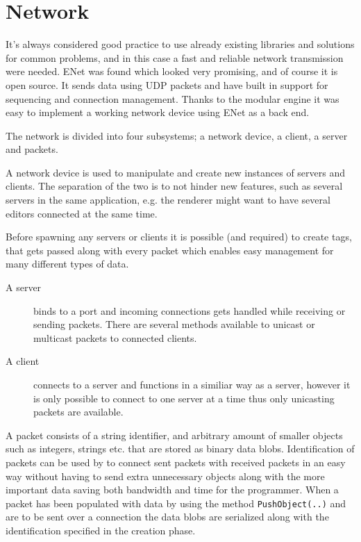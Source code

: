 \section{Network}
It's always considered good practice to use already existing libraries and solutions for common problems, and in this case a fast and reliable network transmission were needed.
ENet was found which looked very promising, and of course it is open source. It sends data using UDP packets and have built in support for sequencing and connection management. 
Thanks to the modular engine it was easy to implement a working network device using ENet as a back end.

The network is divided into four subsystems; a network device, a client, a server and packets.

A network device is used to manipulate and create new instances of servers and clients. The separation of the two is to not hinder new features, such as several servers in the same application, e.g. the renderer might want to have several editors connected at the same time.

Before spawning any servers or clients it is possible (and required) to create tags, that gets passed along with every packet which enables easy \mbox{management} for many different types of data.

\begin{description}
	\item[A server] binds to a port and incoming connections gets handled while \mbox{receiving} or sending packets. There are several methods available to unicast or multicast packets to connected clients.
	\item[A client] connects to a server and functions in a similiar way as a server, however it is only possible to connect to one server at a time thus only unicasting packets are available.
\end{description}

A packet consists of a string identifier, and arbitrary amount of smaller \mbox{objects} such as integers, strings etc. that are stored as binary data blobs.
Identification of packets can be used by to connect sent packets with received packets in an easy way without having to send extra unnecessary objects along with the more important data saving both bandwidth and time for the programmer.
When a packet has been populated with data by using the method \texttt{PushObject(..)} and are to be sent over a connection the data blobs are serialized along with the identification specified in the creation phase.


